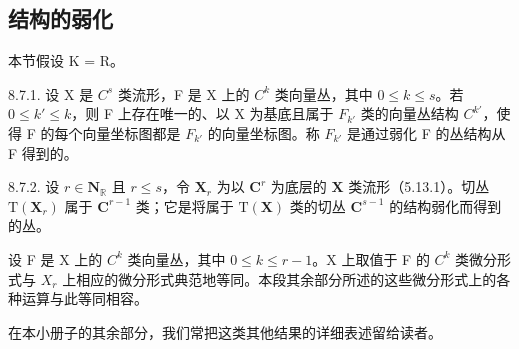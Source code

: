 \subsection{结构的弱化}

本节假设 K = R。

8.7.1. 设 X 是 \(C^{s}\) 类流形，F 是 X 上的 \(C^{k}\) 类向量丛，其中 \(0 \leqslant k \leqslant s\)。若 \(0 \leqslant k' \leqslant k\)，则 F 上存在唯一的、以 X 为基底且属于 \(F_{k'}\) 类的向量丛结构 \(C^{k'}\)，使得 F 的每个向量坐标图都是 \(F_{k'}\) 的向量坐标图。称 \(F_{k'}\) 是通过弱化 F 的丛结构从 F 得到的。

8.7.2. 设 \(r \in \mathbf{N}_{\mathbb{R}}\) 且 \(r \leqslant s\)，令 \(\mathbf{X}_r\) 为以 \(\mathbf{C}^r\) 为底层的 \(\mathbf{X}\) 类流形（5.13.1）。切丛 \(\mathrm{T}(\mathbf{X}_r)\) 属于 \(\mathbf{C}^{r-1}\) 类；它是将属于 \(\mathrm{T}(\mathbf{X})\) 类的切丛 \(\mathbf{C}^{s-1}\) 的结构弱化而得到的丛。

设 F 是 X 上的 \(C^{k}\) 类向量丛，其中 \(0 \leqslant k \leqslant r - 1\)。X 上取值于 F 的 \(C^{k}\) 类微分形式与 \(X_{r}\) 上相应的微分形式典范地等同。本段其余部分所述的这些微分形式上的各种运算与此等同相容。

在本小册子的其余部分，我们常把这类其他结果的详细表述留给读者。

